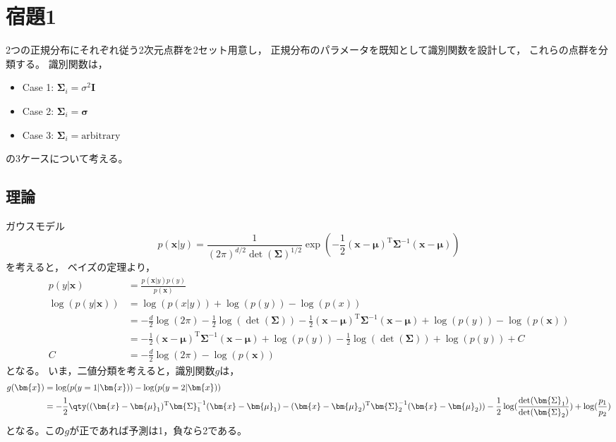 \documentclass[class=jsarticle, crop=false, dvipdfmx, fleqn]{standalone}
\begin{document}
\section*{宿題1}

2つの正規分布にそれぞれ従う2次元点群を2セット用意し，
正規分布のパラメータを既知として識別関数を設計して，
これらの点群を分類する。
識別関数は，
\begin{itemize}
    \item Case 1: \(\bm{\Sigma}_i = \sigma^2 \bm{I}\)
    \item Case 2: \(\bm{\Sigma}_i = \bm{\sigma}\)
    \item Case 3: \(\bm{\Sigma}_i = \text{arbitrary}\)
\end{itemize}
の3ケースについて考える。



\subsection*{理論}

ガウスモデル
\begin{equation}
    p(\bm{x}|y) = \frac{1}{(2\pi)^{d/2} \det(\bm{\Sigma})^{1/2}} \exp(-\frac{1}{2} (\bm{x} - \bm{\mu})^\mathrm{T} \bm{\Sigma}^{-1} (\bm{x} - \bm{\mu}))
\end{equation}
を考えると，
ベイズの定理より，
\begin{align}
    p(y|\bm{x}) & = \frac{p(\bm{x}|y) p(y)}{p(\bm{x})} \\
    \log(p(y|\bm{x}))
        & = \log(p(x|y)) + \log(p(y)) - \log(p(x)) \\
        & = -\frac{d}{2} \log(2 \pi) - \frac{1}{2} \log(\det(\bm{\Sigma})) - \frac{1}{2} (\bm{x} - \bm{\mu})^\mathrm{T} \bm{\Sigma}^{-1} (\bm{x} - \bm{\mu}) + \log(p(y)) - \log(p(\bm{x})) \\
        & = - \frac{1}{2} (\bm{x} - \bm{\mu})^\mathrm{T} \bm{\Sigma}^{-1} (\bm{x} - \bm{\mu}) + \log(p(y)) - \frac{1}{2} \log(\det(\bm{\Sigma})) + \log(p(y)) + C
        \label{eq:log_prob_y_given_x} \\
    C & = -\frac{d}{2} \log(2 \pi) - \log(p(\bm{x}))
\end{align}
となる。
いま，二値分類を考えると，識別関数\(g\)は，
\begin{align}
    g(\bm{x})
        & = \log(p(y=1|\bm{x})) - \log(p(y=2|\bm{x})) \\
        & = -\frac{1}{2} \qty((\bm{x} - \bm{\mu}_1)^\mathrm{T} \bm{\Sigma}_1^{-1} (\bm{x} - \bm{\mu}_1) - (\bm{x} - \bm{\mu}_2)^\mathrm{T} \bm{\Sigma}_2^{-1} (\bm{x} - \bm{\mu}_2)) - \frac{1}{2} \log(\frac{\det(\bm{\Sigma}_1)}{\det(\bm{\Sigma}_2)}) + \log(\frac{p_1}{p_2})
        \label{eq:classifier}
\end{align}
となる。この\(g\)が正であれば予測は1，負なら2である。
\end{document}
